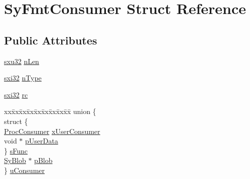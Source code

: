 \hypertarget{struct_sy_fmt_consumer}{\section{Sy\-Fmt\-Consumer Struct Reference}
\label{d0/d51/struct_sy_fmt_consumer}
}
\subsection*{Public Attributes}
\begin{DoxyCompactItemize}
\item 
\hyperlink{unqlite_8c_abc5a8a3f345c200c98c485551f49666e}{sxu32} \hyperlink{struct_sy_fmt_consumer_a17fa4c3c8a5202c454578e137b5e0e4d}{n\-Len}
\item 
\hyperlink{unqlite_8c_a5a58035d4ae379178e2ca46cc3272fc5}{sxi32} \hyperlink{struct_sy_fmt_consumer_ad33c99c547d87550212a37160d516c53}{n\-Type}
\item 
\hyperlink{unqlite_8c_a5a58035d4ae379178e2ca46cc3272fc5}{sxi32} \hyperlink{struct_sy_fmt_consumer_a974429118c6a6e41ffbac6ddfde08599}{rc}
\item 
\begin{tabbing}
xx\=xx\=xx\=xx\=xx\=xx\=xx\=xx\=xx\=\kill
union \{\\
\>struct \{\\
\>\>\hyperlink{unqlite_8h_a23e329c5ae3c9a3233492de42393c93c}{ProcConsumer} \hyperlink{struct_sy_fmt_consumer_abd473394ab5aae306df7edac62160338}{xUserConsumer}\\
\>\>void $\ast$ \hyperlink{struct_sy_fmt_consumer_aa167cd51b3f3d589396ff8089ab01962}{pUserData}\\
\>\} \hyperlink{struct_sy_fmt_consumer_afe9b1d05c8fc8cd88253eb6f2fb24469}{sFunc}\\
\>\hyperlink{struct_sy_blob}{SyBlob} $\ast$ \hyperlink{struct_sy_fmt_consumer_aadda805a9030cab1a6516d424fdc7ac0}{pBlob}\\
\} \hyperlink{struct_sy_fmt_consumer_ae448f0d7174a2cb27abad82989127eba}{uConsumer}\\

\end{tabbing}\end{DoxyCompactItemize}



